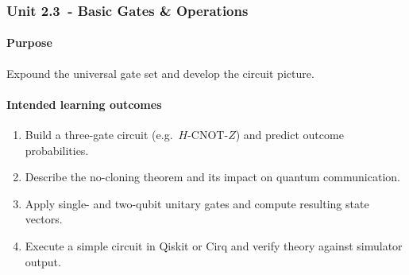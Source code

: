 



\subsubsection*{Unit 2.3 - Basic Gates \& Operations}

\paragraph{Purpose}  
Expound the universal gate set and develop the circuit picture.

\paragraph{Intended learning outcomes}
\begin{enumerate}[label=2.3-\arabic*]
	\item Build a three-gate circuit (e.g.\ $H$-CNOT-$Z$) and predict outcome probabilities.  
	\item Describe the no-cloning theorem and its impact on quantum communication.  
	\item Apply single- and two-qubit unitary gates and compute resulting state vectors.  
	\item Execute a simple circuit in Qiskit or Cirq and verify theory
	against simulator output.
\end{enumerate}

